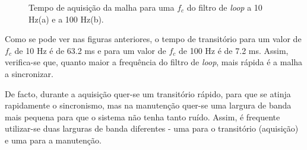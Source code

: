 \documentclass[11pt]{article}
\numberwithin{equation}{section}
\begin{document}
\begin{figure}[H]
	\centering
	\hspace{8mm}
	\vspace{-0.8em}
	\caption{Tempo de aquisição da malha para uma $f_c$ do filtro de \textit{loop} a 10 Hz(a) e a 100 Hz(b).}
	\vspace{-0.8em}
\end{figure}

Como se pode ver nas figuras anteriores, o tempo de transitório para um valor de $f_c$ de 10 Hz é de 63.2 ms e para um valor de $f_c$ de 100 Hz é de 7.2 ms. Assim, verifica-se que, quanto maior a frequência do filtro de \textit{loop}, mais rápida é a malha a sincronizar. 

De facto, durante a aquisição quer-se um transitório rápido, para que se atinja rapidamente o sincronismo, mas na manutenção quer-se uma largura de banda mais pequena para que o sistema não tenha tanto ruído. Assim, é frequente utilizar-se duas larguras de banda diferentes - uma para o transitório (aquisição) e uma para a manutenção.
\end{document}
